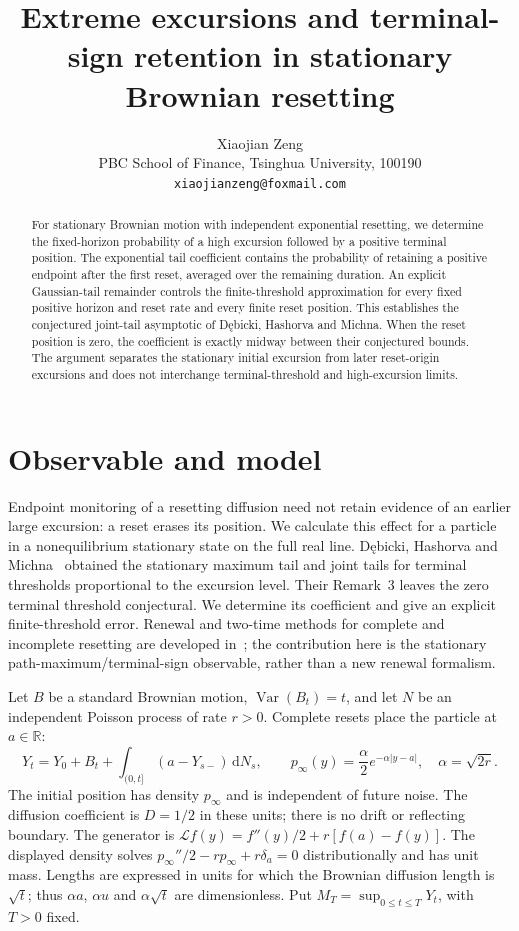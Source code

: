 \documentclass[11pt,a4paper]{article}
\title{Extreme excursions and terminal-sign retention in stationary Brownian resetting}
\author{Xiaojian Zeng\\
\small PBC School of Finance, Tsinghua University, 100190\\
\small \texttt{xiaojianzeng@foxmail.com}}
\date{}
\newcommand{\dd}{\,\mathrm d}
\begin{document}
\maketitle
\begin{abstract}
For stationary Brownian motion with independent exponential resetting, we determine
the fixed-horizon probability of a high excursion followed by a positive terminal
position. The exponential tail coefficient contains the probability of retaining
a positive endpoint after the first reset, averaged over the remaining duration.
An explicit Gaussian-tail remainder controls the finite-threshold approximation
for every fixed positive horizon and reset rate and every finite reset position.
This establishes the conjectured joint-tail asymptotic of Dębicki, Hashorva and
Michna. When the reset position is zero, the coefficient is exactly midway between
their conjectured bounds. The argument separates the stationary initial excursion
from later reset-origin excursions and does not interchange terminal-threshold
and high-excursion limits.
\end{abstract}

\section{Observable and model}
Endpoint monitoring of a resetting diffusion need not retain evidence of an earlier
large excursion: a reset erases its position. We calculate this effect for a particle
in a nonequilibrium stationary state on the full real line. Dębicki, Hashorva and
Michna~\cite{DHM} obtained the stationary maximum tail and joint tails for terminal
thresholds proportional to the excursion level. Their Remark~3 leaves the zero
terminal threshold conjectural. We determine its coefficient and give an explicit
finite-threshold error. Renewal and two-time methods for complete and incomplete
resetting are developed in~\cite{TMM}; the contribution here is the stationary
path-maximum/terminal-sign observable, rather than a new renewal formalism.

Let $B$ be a standard Brownian motion, $\operatorname{Var}(B_t)=t$, and let $N$
be an independent Poisson process of rate $r>0$. Complete resets place the particle
at $a\in\mathbb R$:
\begin{equation}\label{eq:model}
Y_t=Y_0+B_t+\int_{(0,t]}(a-Y_{s-})\dd N_s,\qquad
p_\infty(y)=\frac{\alpha}{2}e^{-\alpha|y-a|},\quad \alpha=\sqrt{2r}.
\end{equation}
The initial position has density $p_\infty$ and is independent of future noise.
The diffusion coefficient is $D=1/2$ in these units; there is no drift or reflecting
boundary. The generator is
$\mathcal L f(y)=f''(y)/2+r[f(a)-f(y)]$.
The displayed density solves
$p_\infty''/2-rp_\infty+r\delta_a=0$ distributionally and has unit mass.
Lengths are expressed in units for which the Brownian diffusion length is
$\sqrt t$; thus $\alpha a$, $\alpha u$ and $\alpha\sqrt t$ are dimensionless.
Put $M_T=\sup_{0\leq t\leq T}Y_t$, with $T>0$ fixed.
\end{document}
